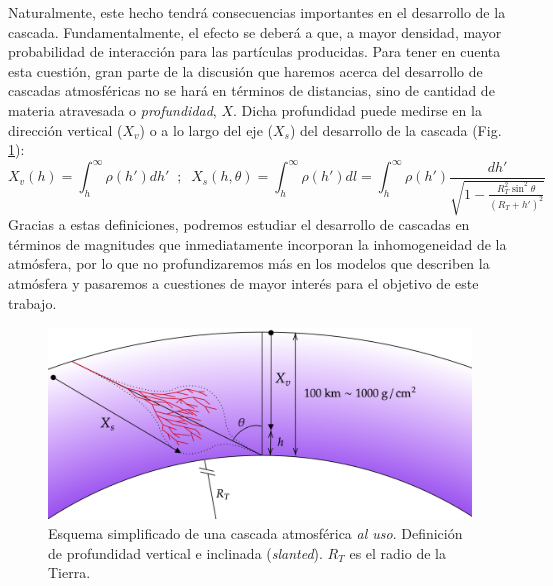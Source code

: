 \documentclass[12 pt, a4paper]{article} %
\numberwithin{equation}{section}
\numberwithin{figure}{section}
\numberwithin{table}{section}
\begin{document}
Naturalmente, este hecho tendrá consecuencias importantes en el desarrollo de la cascada. Fundamentalmente, el efecto se deberá a que, a mayor densidad, mayor probabilidad de interacción para las partículas producidas. Para tener en cuenta esta cuestión, gran parte de la discusión que haremos acerca del desarrollo de cascadas atmosféricas no se hará en términos de distancias, sino de cantidad de materia atravesada o \textit{profundidad}, $X$. Dicha profundidad puede medirse en la dirección vertical ($X_v$) o a lo largo del eje ($X_s$) del desarrollo de la cascada (Fig. \ref{shower_params}):
\begin{equation}
	X_v(h)=\int_{h}^\infty\rho(h')dh'\;\;;\;\;X_s(h,\theta)=\int_{h}^\infty\rho(h')dl=\int_h^{\infty}\rho(h')\frac{dh'}{\sqrt{1-\frac{R_T^2\sin^2{\theta}}{\left(R_T+h'\right)^2}}}\label{ec22}
\end{equation}
Gracias a estas definiciones, podremos estudiar el desarrollo de cascadas en términos de magnitudes que inmediatamente incorporan la inhomogeneidad de la atmósfera, por lo que no profundizaremos más en los modelos que describen la atmósfera y pasaremos a cuestiones de mayor interés para el objetivo de este trabajo.

\begin{figure}[H]
	\centering
	\includegraphics[width=.7\linewidth]{figures/cascadas/shower_params}
	\caption{Esquema simplificado de una cascada atmosférica \textit{al uso}. Definición de profundidad vertical e inclinada (\textit{slanted}). $R_T$ es el radio de la Tierra.}
	\label{shower_params}
\end{figure}
\end{document}
